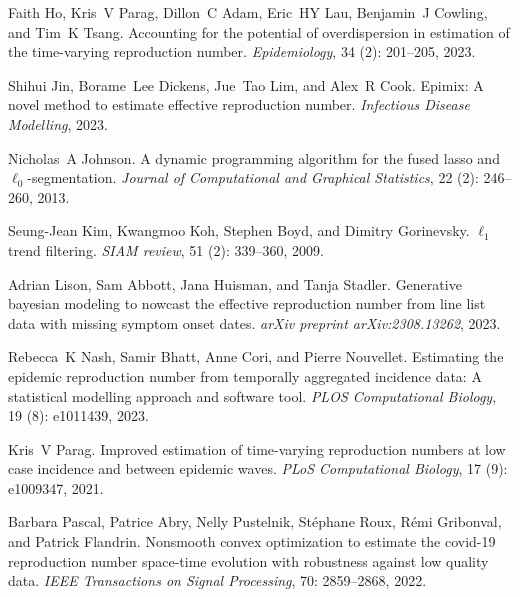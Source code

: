 \documentclass[10pt,letterpaper]{article}
\begin{document}
\begin{thebibliography}{32}
  Faith Ho, Kris~V Parag, Dillon~C Adam, Eric~HY Lau, Benjamin~J Cowling, and
    Tim~K Tsang.
  \newblock Accounting for the potential of overdispersion in estimation of the
    time-varying reproduction number.
  \newblock \emph{Epidemiology}, 34 (2): 201--205, 2023.
  
  Shihui Jin, Borame~Lee Dickens, Jue~Tao Lim, and Alex~R Cook.
  \newblock Epimix: A novel method to estimate effective reproduction number.
  \newblock \emph{Infectious Disease Modelling}, 2023.
  
  Nicholas~A Johnson.
  \newblock A dynamic programming algorithm for the fused lasso and
    $\ell_0$-segmentation.
  \newblock \emph{Journal of Computational and Graphical Statistics}, 22
    (2): 246--260, 2013.
  
  Seung-Jean Kim, Kwangmoo Koh, Stephen Boyd, and Dimitry Gorinevsky.
  \newblock $\ell_1$ trend filtering.
  \newblock \emph{SIAM review}, 51 (2): 339--360, 2009.
  
  Adrian Lison, Sam Abbott, Jana Huisman, and Tanja Stadler.
  \newblock Generative bayesian modeling to nowcast the effective reproduction
    number from line list data with missing symptom onset dates.
  \newblock \emph{arXiv preprint arXiv:2308.13262}, 2023.
  
  Rebecca~K Nash, Samir Bhatt, Anne Cori, and Pierre Nouvellet.
  \newblock Estimating the epidemic reproduction number from temporally
    aggregated incidence data: A statistical modelling approach and software
    tool.
  \newblock \emph{PLOS Computational Biology}, 19 (8):
    e1011439, 2023.
  
  Kris~V Parag.
  \newblock Improved estimation of time-varying reproduction numbers at low case
    incidence and between epidemic waves.
  \newblock \emph{PLoS Computational Biology}, 17 (9):
    e1009347, 2021.
  
  Barbara Pascal, Patrice Abry, Nelly Pustelnik, St{\'e}phane Roux, R{\'e}mi
    Gribonval, and Patrick Flandrin.
  \newblock Nonsmooth convex optimization to estimate the covid-19 reproduction
    number space-time evolution with robustness against low quality data.
  \newblock \emph{IEEE Transactions on Signal Processing}, 70:
    2859--2868, 2022.
  

\end{thebibliography}
\end{document}
